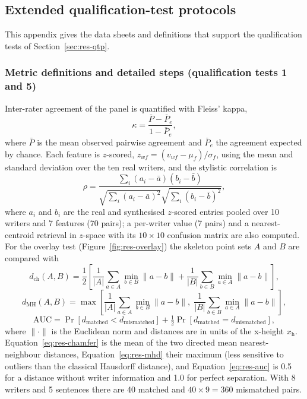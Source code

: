 \subsection{Extended qualification-test protocols}

This appendix gives the data sheets and definitions that support the qualification tests of Section~\ref{sec:res-qtp}.

\subsubsection{Metric definitions and detailed steps (qualification tests 1 and 5)}

Inter-rater agreement of the panel is quantified with Fleiss' kappa,
\begin{equation}
\label{eq:res-kappa}
\kappa=\frac{\bar P-\bar P_e}{1-\bar P_e},
\end{equation}
where $\bar P$ is the mean observed pairwise agreement and $\bar P_e$ the agreement expected by chance.
Each feature is $z$-scored, $z_{wf}=(v_{wf}-\mu_f)/\sigma_f$, using the mean and standard deviation over the ten real writers, and the stylistic correlation is
\begin{equation}
\label{eq:res-pearson}
\rho=\frac{\sum_{i}(a_i-\bar a)(b_i-\bar b)}{\sqrt{\sum_i(a_i-\bar a)^2}\sqrt{\sum_i(b_i-\bar b)^2}},
\end{equation}
where $a_i$ and $b_i$ are the real and synthesised $z$-scored entries pooled over 10 writers and 7 features (70 pairs); a per-writer value (7 pairs) and a nearest-centroid retrieval in $z$-space with its $10\times10$ confusion matrix are also computed.
For the overlay test (Figure~\ref{fig:res-overlay}) the skeleton point sets $A$ and $B$ are compared with
\begin{equation}
\label{eq:res-chamfer}
d_{\mathrm{ch}}(A,B)=\frac{1}{2}\left[\frac{1}{\lvert A\rvert}\sum_{a\in A}\min_{b\in B}\lVert a-b\rVert+\frac{1}{\lvert B\rvert}\sum_{b\in B}\min_{a\in A}\lVert a-b\rVert\right],
\end{equation}
\begin{equation}
\label{eq:res-mhd}
d_{\mathrm{MH}}(A,B)=\max\left[\frac{1}{\lvert A\rvert}\sum_{a\in A}\min_{b\in B}\lVert a-b\rVert,\;\frac{1}{\lvert B\rvert}\sum_{b\in B}\min_{a\in A}\lVert a-b\rVert\right],
\end{equation}
\begin{equation}
\label{eq:res-auc}
\mathrm{AUC}=\Pr\left[d_{\mathrm{matched}}<d_{\mathrm{mismatched}}\right]+\tfrac{1}{2}\Pr\left[d_{\mathrm{matched}}=d_{\mathrm{mismatched}}\right],
\end{equation}
where $\lVert\cdot\rVert$ is the Euclidean norm and distances are in units of the x-height $x_{\mathrm{h}}$.
Equation~\ref{eq:res-chamfer} is the mean of the two directed mean nearest-neighbour distances, Equation~\ref{eq:res-mhd} their maximum (less sensitive to outliers than the classical Hausdorff distance), and Equation~\ref{eq:res-auc} is 0.5 for a distance without writer information and 1.0 for perfect separation.
With 8 writers and 5 sentences there are 40 matched and $40\times9=360$ mismatched pairs.

